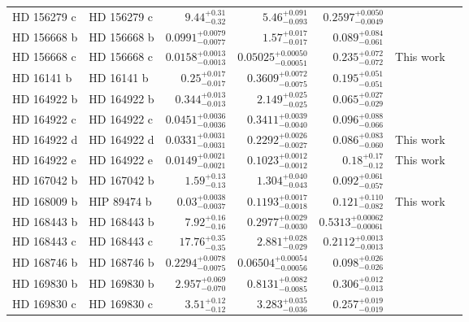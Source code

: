 \begin{longtable*}{llrrrrr}
HD 156279 c & HD 156279 c & $9.44^{+0.31}_{-0.32}$ & $5.46^{+0.091}_{-0.093}$ & $0.2597^{+0.0050}_{-0.0049}$ & \cite{Bryan16} & \\
HD 156668 b & HD 156668 b & $0.0991^{+0.0079}_{-0.0077}$ & $1.57^{+0.017}_{-0.017}$ & $0.089^{+0.084}_{-0.061}$ & \cite{Howard11} & \\
HD 156668 c & HD 156668 c & $0.0158^{+0.0013}_{-0.0013}$ & $0.05025^{+0.00050}_{-0.00051}$ & $0.235^{+0.072}_{-0.072}$ & This work & \\
HD 16141 b & HD 16141 b & $0.25^{+0.017}_{-0.017}$ & $0.3609^{+0.0072}_{-0.0075}$ & $0.195^{+0.051}_{-0.051}$ & \cite{Butler06} & \\
HD 164922 b & HD 164922 b & $0.344^{+0.013}_{-0.013}$ & $2.149^{+0.025}_{-0.025}$ & $0.065^{+0.027}_{-0.029}$ & \cite{Butler06} & \\
HD 164922 c & HD 164922 c & $0.0451^{+0.0036}_{-0.0036}$ & $0.3411^{+0.0039}_{-0.0040}$ & $0.096^{+0.088}_{-0.066}$ & \cite{Fulton16} & \\
HD 164922 d & HD 164922 d & $0.0331^{+0.0031}_{-0.0031}$ & $0.2292^{+0.0026}_{-0.0027}$ & $0.086^{+0.083}_{-0.060}$ & This work & \\
HD 164922 e & HD 164922 e & $0.0149^{+0.0021}_{-0.0021}$ & $0.1023^{+0.0012}_{-0.0012}$ & $0.18^{+0.17}_{-0.12}$ & This work & \\
HD 167042 b & HD 167042 b & $1.59^{+0.13}_{-0.13}$ & $1.304^{+0.040}_{-0.043}$ & $0.092^{+0.061}_{-0.057}$ & \cite{Johnson08} & \\
HD 168009 b & HIP 89474 b & $0.03^{+0.0038}_{-0.0037}$ & $0.1193^{+0.0017}_{-0.0018}$ & $0.121^{+0.110}_{-0.082}$ & This work & \\
HD 168443 b & HD 168443 b & $7.92^{+0.16}_{-0.16}$ & $0.2977^{+0.0029}_{-0.0030}$ & $0.5313^{+0.00062}_{-0.00061}$ & \cite{Wittenmyer07} & \\
HD 168443 c & HD 168443 c & $17.76^{+0.35}_{-0.35}$ & $2.881^{+0.028}_{-0.029}$ & $0.2112^{+0.0013}_{-0.0013}$ & \cite{Wittenmyer07} & \\
HD 168746 b & HD 168746 b & $0.2294^{+0.0078}_{-0.0075}$ & $0.06504^{+0.00054}_{-0.00056}$ & $0.098^{+0.026}_{-0.026}$ & \cite{Pepe02} & \\
HD 169830 b & HD 169830 b & $2.957^{+0.069}_{-0.070}$ & $0.8131^{+0.0082}_{-0.0085}$ & $0.306^{+0.012}_{-0.013}$ & \cite{Naef01} & \\
HD 169830 c & HD 169830 c & $3.51^{+0.12}_{-0.12}$ & $3.283^{+0.035}_{-0.036}$ & $0.257^{+0.019}_{-0.019}$ & \cite{Mayor04} & \\

\end{longtable*}
